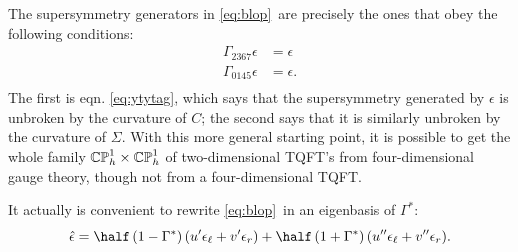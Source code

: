 The supersymmetry generators in \eqref{eq:blop}\ are precisely the ones that
obey the following conditions:
\setcounter{equation}{15}
\begin{equation}\label{eq:zonop}
\begin{aligned}\Gamma_{2367}\epsilon& = \epsilon \\
\Gamma_{0145}\epsilon & = \epsilon.\\\end{aligned}
\end{equation}
 The first is eqn. \eqref{eq:ytytag},
which says that the supersymmetry generated by $\epsilon$ is
unbroken by the curvature of $C$; the second says that it is
similarly unbroken by the curvature of $\Sigma$. With this more
general starting point, it is possible to get the whole family
$\Bbb{CP}_h^1\times \Bbb{CP}_h^1$ of two-dimensional TQFT's from
four-dimensional gauge theory, though not from a four-dimensional
TQFT.

It actually is convenient to rewrite \eqref{eq:blop}\ in an eigenbasis of
$\Gamma^*$:
\setcounter{equation}{16}
\begin{equation}\label{eq:bilop}
\hat\epsilon=\half\left(1-\Gamma^*\right)(u'\epsilon_\ell+v'\epsilon_r)
+\half\left(1+\Gamma^*\right)(u''\epsilon_\ell+v''\epsilon_r).
\end{equation}

